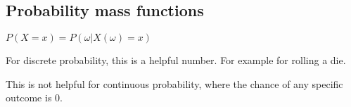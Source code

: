 
\subsection{Probability mass functions}

$P(X=x)=P({\omega |X(\omega)=x})$

For discrete probability, this is a helpful number. For example for rolling a die.

This is not helpful for continuous probability, where the chance of any specific outcome is \(0\).

